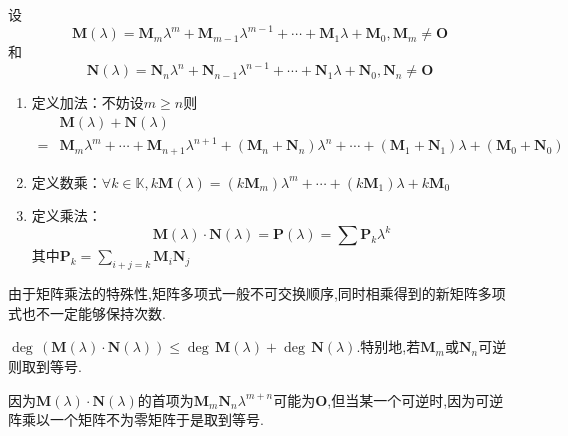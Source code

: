 \begin{formal}
\begin{definition}[其他定义]\label{def:矩阵多项式的其他定义}
    设
    \[
    \bm{M}\left(\lambda\right)=\bm{M}_m\lambda^m+\bm{M}_{m-1}\lambda^{m-1}+\cdots+\bm{M}_1\lambda+\bm{M}_0,\bm{M}_m\neq \bm{O}
    \]和
    \[
    \bm{N}\left(\lambda\right)=\bm{N}_n\lambda^n+\bm{N}_{n-1}\lambda^{n-1}+\cdots+\bm{N}_1\lambda+\bm{N}_0,\bm{N}_n\neq \bm{O}
    \]
    \begin{enumerate}[label={\textup{(\arabic*)}}]
        \item 定义加法：不妨设$m\geqslant n$则
        \begin{align*}
            &\bm{M}\left(\lambda\right)+\bm{N}\left(\lambda\right)\\
            =&
        \bm{M}_m\lambda^m+\cdots+\bm{M}_{n+1}\lambda^{n+1}+\left(\bm{M}_n+\bm{N}_n\right)\lambda^n+\cdots+\left(\bm{M}_1+\bm{N}_1\right)\lambda+\left(\bm{M}_0+\bm{N}_0\right)
        \end{align*}
        \item 定义数乘：$\forall k\in \mathbb{K},k\bm{M}\left(\lambda\right)=\left(k\bm{M}_m\right)\lambda^m+\cdots+\left(k\bm{M}_1\right)\lambda+k\bm{M}_0$
        \item 定义乘法：\[
        \bm{M}\left(\lambda\right)\cdot \bm{N}\left(\lambda\right)=\bm{P}\left(\lambda\right)=\sum\bm{P}_k\lambda^k
        \]其中$\displaystyle
        \bm{P}_k=\sum_{i+j=k}\bm{M}_i\bm{N}_j$
    \end{enumerate}
\end{definition}
\end{formal}
\begin{red}
    \begin{remark}
        由于矩阵乘法的特殊性,矩阵多项式一般不可交换顺序,同时相乘得到的新矩阵多项式也不一定能够保持次数.
    \end{remark}
\end{red}
\begin{green}
\begin{lemma}[乘积的次数]\label{lem:矩阵多项式的乘积的次数}
    $\deg\,\left(\bm{M}\left(\lambda\right)\cdot\bm{N}\left(\lambda\right)\right)\leqslant \deg\,\bm{M}\left(\lambda\right)+\deg\,\bm{N}\left(\lambda\right)$.特别地,若$\bm{M}_m$或$\bm{N}_n$可逆则取到等号.
\end{lemma}
\begin{Proof}
因为$\bm{M}\left(\lambda\right)\cdot\bm{N}\left(\lambda\right)$的首项为$\bm{M}_m\bm{N}_n\lambda^{m+n}$可能为$\bm{O}$,但当某一个可逆时,因为可逆阵乘以一个矩阵不为零矩阵于是取到等号.
\end{Proof}
\end{green}
